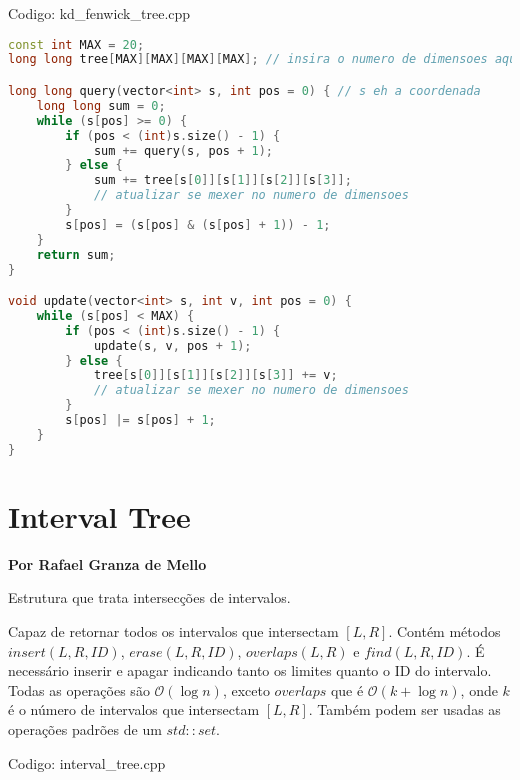 \documentclass[10pt, a4paper, oneside]{book}
\begin{document}
\hfill

Codigo: kd\_fenwick\_tree.cpp

\begin{lstlisting}[language=C++]
const int MAX = 20;
long long tree[MAX][MAX][MAX][MAX]; // insira o numero de dimensoes aqui

long long query(vector<int> s, int pos = 0) { // s eh a coordenada
    long long sum = 0;
    while (s[pos] >= 0) {
        if (pos < (int)s.size() - 1) {
            sum += query(s, pos + 1);
        } else {
            sum += tree[s[0]][s[1]][s[2]][s[3]];
            // atualizar se mexer no numero de dimensoes
        }
        s[pos] = (s[pos] & (s[pos] + 1)) - 1;
    }
    return sum;
}

void update(vector<int> s, int v, int pos = 0) {
    while (s[pos] < MAX) {
        if (pos < (int)s.size() - 1) {
            update(s, v, pos + 1);
        } else {
            tree[s[0]][s[1]][s[2]][s[3]] += v;
            // atualizar se mexer no numero de dimensoes
        }
        s[pos] |= s[pos] + 1;
    }
}\end{lstlisting}
\hfill

\section{Interval Tree}


\textbf{Por Rafael Granza de Mello}



Estrutura que trata intersecções de intervalos.



Capaz de retornar todos os intervalos que intersectam $[L, R]$. Contém métodos $insert({L, R, ID})$, $erase({L, R, ID})$, $overlaps(L, R)$ e $find({L, R, ID})$. É necessário inserir e apagar indicando tanto os limites quanto o ID do intervalo. Todas as operações são $\mathcal{O}(\log n)$, exceto $overlaps$ que é $\mathcal{O}(k + \log n)$, onde $k$ é o número de intervalos que intersectam $[L, R]$. Também podem ser usadas as operações padrões de um $std::set$.

\hfill

Codigo: interval\_tree.cpp
\end{document}
